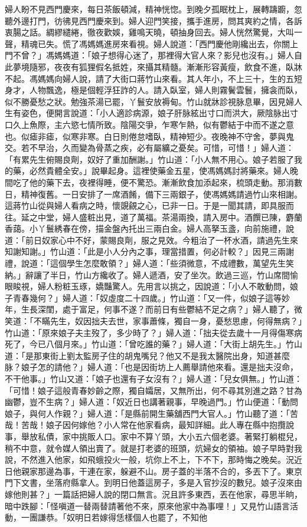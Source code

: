 婦人盼不見西門慶來，每日茶飯頓減，精神恍惚。到晚夕孤眠枕上，展轉躊躕，忽聽外邊打門，彷彿見西門慶來到。婦人迎門笑接，攜手進房，問其爽約之情，各訴衷腸之話。綢繆繾綣，徹夜歡娛，雞鳴天曉，頓抽身回去。婦人恍然驚覺，大叫一聲，精魂已失。慌了馮媽媽進房來看視。婦人說道：「西門慶他剛纔出去，你關上門不曾？」馮媽媽道：「娘子想得心迷了，那裡得大官人來？影兒也沒有。」婦人自此夢境隨邪，夜夜有狐狸假名抵姓，來攝其精髓。漸漸形容黃瘦，飲食不進，臥牀不起。馮媽媽向婦人說，請了大街口蔣竹山來看。其人年小，不上三十，生的五短身才，人物飄逸，極是個輕浮狂詐的人。請入臥室，婦人則霧鬢雲鬟，擁衾而臥，似不勝憂愁之狀。勉強茶湯已罷，丫鬟安放褥甸。竹山就牀診視脉息畢，因見婦人生有姿色，便開言說道：「小人適診病源，娘子肝脉絃出寸口而洪大，厥陰脉出寸口久上魚際，主六慾七情所致。陰陽交爭，乍寒乍熱，似有鬱結于中而不遂之意也。似瘧非瘧，似寒非寒。白日則倦怠嗜臥，精神短少。夜晚神不守舍，夢與鬼交。若不早治，久而變為骨蒸之疾，必有屬纊之憂矣。可惜，可惜！」婦人道：「有累先生俯賜良劑，奴好了重加酬謝。」竹山道：「小人無不用心。娘子若服了我的藥，必然貴體全安。」說畢起身。這裡使藥金五星，使馮媽媽討將藥來。婦人晚間吃了他的藥下去，夜裡得睡，便不驚恐。漸漸飲食加添起來，梳頭走動。那消數日，精神復舊。一日安排了一席酒餚，備下三兩銀子，使馮媽媽請過竹山來相謝。這蔣竹山從與婦人看病之時，懷覬覦之心，已非一日。于是一聞其請，即具服而往。延之中堂，婦人盛粧出見，道了萬福。茶湯兩換，請入房中。酒饌已陳，麝蘭香藹。小丫鬟綉春在傍，描金盤內托出三兩白金。婦人高拏玉盞，向前施禮，說道：「前日奴家心中不好，蒙賜良劑，服之見效。今粗治了一杯水酒，請過先生來知謝知謝。」竹山道：「此是小人分內之事，理當措置，何必計較？」因見三兩謝禮，說道：「這個學生怎麼敢領？」婦人道：「些須微意，不成禮數，萬望先生笑納。」辭讓了半日，竹山方纔收了。婦人遞酒，安了坐次。飲過三巡，竹山席間愉眼睃視，婦人粉粧玉琢，嬌豔驚人。先用言以挑之，因說道：「小人不敢動問，娘子青春幾何？」婦人道：「奴虛度二十四歲。」竹山道：「又一件，似娘子這等妙年，生長深閨，處于富足，何事不遂？而前日有些鬱結不足之病？」婦人聽了，微笑道：「不瞞先生，奴因拙夫去世，家事蕭條，獨自一身，憂愁思慮，何得無病？」竹山道：「原來娘子夫主歿了，多少時了？」婦人道：「拙夫從去歲十一月得傷寒病死了，今已八個月來。」竹山道：「曾吃誰的藥？」婦人道：「大街上胡先生。」竹山道：「是那東街上劉太監房子住的胡鬼嘴兒？他又不是我太醫院出身，知道甚麼脉？娘子怎的請他？」婦人道：「也是因街坊上人薦舉請他來看。還是拙夫沒命，不干他事。」竹山又道：「娘子也還有子女沒有？」婦人道：「兒女俱無。」竹山道：「可惜！娘子這般青春妙齡之際，獨自孀居，又無所出，何不尋其別進之路？甘為幽鬱，豈不生病？」婦人道：「奴近日也講著親事，早晚過門。」竹山便道：「動問娘子，與何人作親？」婦人道：「是縣前開生藥舖西門大官人。」竹山聽了道：「苦哉！苦哉！娘子因何嫁他？小人常在他家看病，最知詳細。此人專在縣中抱攬說事，舉放私債，家中挑販人口。家中不算丫頭，大小五六個老婆。著緊打躺棍兒，稍不中意，就令媒人領出賣了。就是打老婆的班頭，炕婦女的領袖。娘子早時對我說，不然進入他家，如飛蛾投火一般，坑你上不上，下不下，那時悔之晚矣。況近日他親家那邊為事，干連在家，躲避不山。房子蓋的半落不合的，多丟下了。東京門下文書，坐落府縣拿人。到明日他蓋這房子，多是入官抄沒的數兒。娘子沒來由嫁他則甚？」一篇話把婦人說的閉口無言。況且許多東西，丟在他家，尋思半晌，暗中跌腳：「怪嗔道一替兩替請著他不來，原來他家中為事哩！」又見竹山語言活動，一團謙恭。「奴明日若嫁得恁樣個人也罷了，不知他